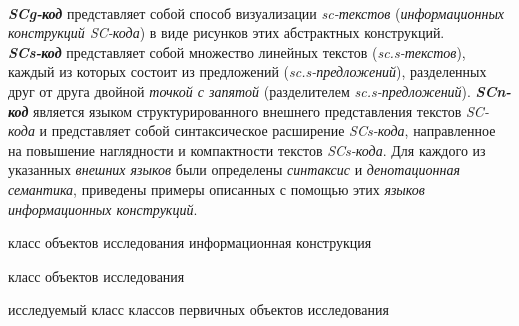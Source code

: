 \begin{SCn}
\begin{scnstruct}
{            \\\textbf{\textit{SCg-код}} представляет собой способ визуализации \textit{sc-текстов} (\textit{информационных конструкций SC-кода}) в виде рисунков этих абстрактных конструкций.
            \\\textbf{\textit{SCs-код}} представляет собой множество линейных текстов (\textit{sc.s-текстов}), каждый из которых состоит из предложений (\textit{sc.s-предложений}), разделенных друг от друга двойной \textit{точкой с запятой} (разделителем \textit{sc.s-предложений}).
            \textbf{\textit{SCn-код}} является языком структурированного внешнего представления текстов \textit{SC-кода} и представляет собой синтаксическое расширение \textit{SCs-кода}, направленное на повышение наглядности и компактности текстов \textit{SCs-кода}.
            Для каждого из указанных \textit{внешних языков} были определены \textit{синтаксис} и \textit{денотационная семантика}, приведены примеры описанных с помощью этих \textit{языков} \textit{информационных конструкций}.}
        \begin{scnhaselementrole}{класс объектов исследования}
            {информационная конструкция}
        \end{scnhaselementrole}
        \begin{scnhaselementrolelist}{класс объектов исследования}
        \end{scnhaselementrolelist}
        \begin{scnhaselementrolelist}{исследуемый класс классов первичных объектов исследования}

\end{scnhaselementrolelist}
\end{scnstruct}
\end{SCn}
